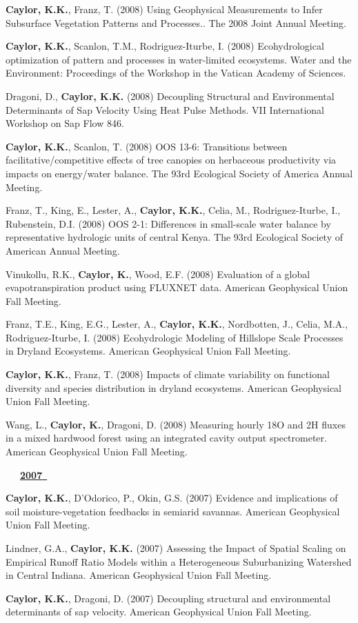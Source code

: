 \begin{etaremune}
\item \textbf{ Caylor, K.K.}, Franz, T. (2008) Using Geophysical Measurements to Infer Subsurface Vegetation Patterns and Processes.. The 2008 Joint Annual Meeting.
\item \textbf{ Caylor, K.K.}, Scanlon, T.M., Rodriguez-Iturbe, I. (2008) Ecohydrological optimization of pattern and processes in water-limited ecosystems. Water and the Environment: Proceedings of the Workshop in the Vatican Academy of Sciences.
\item Dragoni, D., \textbf{ Caylor, K.K.} (2008) Decoupling Structural and Environmental Determinants of Sap Velocity Using Heat Pulse Methods. VII International Workshop on Sap Flow 846.
\item \textbf{ Caylor, K.K.}, Scanlon, T. (2008) OOS 13-6: Transitions between facilitative/competitive effects of tree canopies on herbaceous productivity via impacts on energy/water balance. The 93rd Ecological Society of America Annual Meeting.
\item Franz, T., King, E., Lester, A., \textbf{ Caylor, K.K.}, Celia, M., Rodriguez-Iturbe, I., Rubenstein, D.I. (2008) OOS 2-1: Differences in small-scale water balance by representative hydrologic units of central Kenya. The 93rd Ecological Society of American Annual Meeting.
\item Vinukollu, R.K., \textbf{ Caylor, K.}, Wood, E.F. (2008) Evaluation of a global evapotranspiration product using FLUXNET data. American Geophysical Union Fall Meeting.
\item Franz, T.E., King, E.G., Lester, A., \textbf{ Caylor, K.K.}, Nordbotten, J., Celia, M.A., Rodriguez-Iturbe, I. (2008) Ecohydrologic Modeling of Hillslope Scale Processes in Dryland Ecosystems. American Geophysical Union Fall Meeting.
\item \textbf{ Caylor, K.K.}, Franz, T. (2008) Impacts of climate variability on functional diversity and species distribution in dryland ecosystems. American Geophysical Union Fall Meeting.
\item Wang, L., \textbf{ Caylor, K.}, Dragoni, D. (2008) Measuring hourly 18O and 2H fluxes in a mixed hardwood forest using an integrated cavity output spectrometer. American Geophysical Union Fall Meeting.

\vspace{0.1in}
\mbox{\ \ \ \underline{\textbf{2007 }}}
\vspace{0.1in}

\item \textbf{ Caylor, K.K.}, D'Odorico, P., Okin, G.S. (2007) Evidence and implications of soil moisture-vegetation feedbacks in semiarid savannas. American Geophysical Union Fall Meeting.
\item Lindner, G.A., \textbf{ Caylor, K.K.} (2007) Assessing the Impact of Spatial Scaling on Empirical Runoff Ratio Models within a Heterogeneous Suburbanizing Watershed in Central Indiana. American Geophysical Union Fall Meeting.
\item \textbf{ Caylor, K.K.}, Dragoni, D. (2007) Decoupling structural and environmental determinants of sap velocity. American Geophysical Union Fall Meeting.


\end{etaremune}
